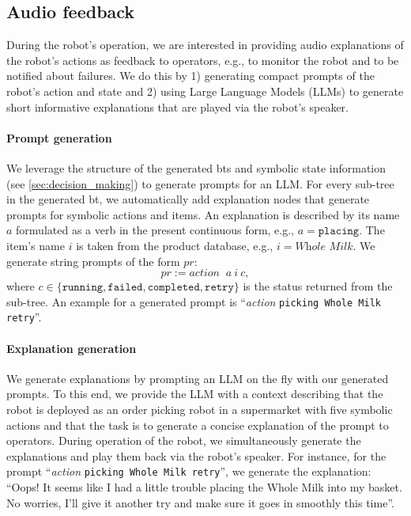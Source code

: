\subsection{Audio feedback}
\label{sec:language_feedback}

During the robot's operation, we are interested in providing
audio explanations of the robot's actions as feedback to
operators, e.g., to monitor the robot and to be notified
about failures. We do this by 1) generating compact prompts
of the robot's action and state and 2) using Large Language
Models (LLMs) to generate short informative explanations
that are played via the robot's speaker.


\paragraph{Prompt generation}
We leverage the structure of the generated \acp{bt} and
symbolic state information (see \cref{sec:decision_making})
to generate prompts for an LLM. For every sub-tree in the
generated \ac{bt}, we automatically add explanation
nodes that
generate prompts for symbolic actions and items. An
explanation is
described by its name $a$ formulated as a verb in the
present continuous form, e.g., $a=\texttt{placing}$. The
item's name $i$ is taken from the product database, e.g.,
$i=\textit{Whole Milk}$. We generate string prompts of the
form $pr$:
\begin{equation*}
    pr := \textit{action }~a~i~c,
\end{equation*}
where $c\in\{\texttt{running},\texttt{failed}, \texttt{completed}, \texttt{retry}\}$ is the status returned from the sub-tree.
An example for a generated prompt is ``\textit{action }\texttt{picking }\texttt{Whole Milk }\texttt{retry}''.


\paragraph{Explanation generation}
We generate explanations by prompting an LLM on the fly with our generated prompts. 
To this end, we provide the LLM with a context describing
that the robot is deployed as an order picking robot in a
supermarket with five symbolic actions and that the task is to generate a concise explanation of the prompt to operators. 
During operation of the robot, we simultaneously generate the explanations and play them back via the robot's speaker.
For instance, for the prompt  ``\textit{action }\texttt{picking }\texttt{Whole Milk }\texttt{retry}'', we generate the explanation: ``Oops! It seems like I had a little trouble placing the Whole Milk into my basket. No worries, I'll give it another
  try and make sure it goes in smoothly this time''.

